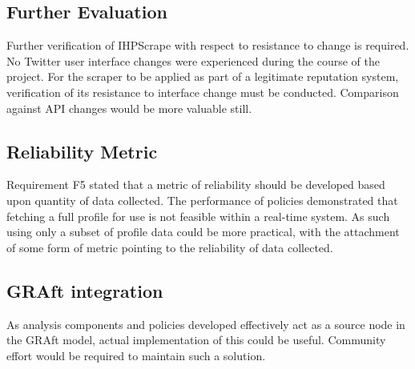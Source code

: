 
\subsection{Further Evaluation}

Further verification of IHPScrape with respect to resistance to change is required. No Twitter user interface changes were experienced during the course of the project. For the scraper to be applied as part of a legitimate reputation system, verification of its resistance to interface change must be conducted. Comparison against API changes would be more valuable still.

\subsection{Reliability Metric}

Requirement F5 stated that a metric of reliability should be developed based upon quantity of data collected. The performance of policies demonstrated that fetching a full profile for use is not feasible within a real-time system. As such using only a subset of profile data could be more practical, with the attachment of some form of metric pointing to the reliability of data collected.

\subsection{GRAft integration}

As analysis components and policies developed effectively act as a source node in the GRAft model, actual implementation of this could be useful. Community effort would be required to maintain such a solution.